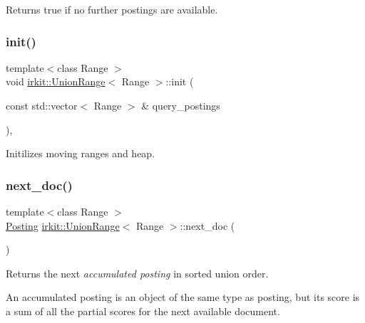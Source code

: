 Returns true if no further postings are available. 

\mbox{\label{classirkit_1_1UnionRange_aabdf133213056f20e0526c6736dbff3e}} 
\subsubsection{\texorpdfstring{init()}{init()}}
{\footnotesize\ttfamily template$<$class Range $>$ \\
void \hyperlink{classirkit_1_1UnionRange}{irkit\+::\+Union\+Range}$<$ Range $>$\+::init (\begin{DoxyParamCaption}\item[{const std\+::vector$<$ Range $>$ \&}]{query\+\_\+postings }\end{DoxyParamCaption})\hspace{0.3cm}{\ttfamily [inline]}, {\ttfamily [protected]}}



Initilizes moving ranges and heap. 

\mbox{\label{classirkit_1_1UnionRange_a9161a468e74df4e76cd04104763f7d97}} 
\subsubsection{\texorpdfstring{next\+\_\+doc()}{next\_doc()}}
{\footnotesize\ttfamily template$<$class Range $>$ \\
\hyperlink{classirkit_1_1UnionRange_a5f694970419f5a60d7fd41d740556229}{Posting} \hyperlink{classirkit_1_1UnionRange}{irkit\+::\+Union\+Range}$<$ Range $>$\+::next\+\_\+doc (\begin{DoxyParamCaption}{ }\end{DoxyParamCaption})\hspace{0.3cm}{\ttfamily [inline]}}



Returns the next {\itshape accumulated posting} in sorted union order. 

An accumulated posting is an object of the same type as posting, but its score is a sum of all the partial scores for the next available document.

